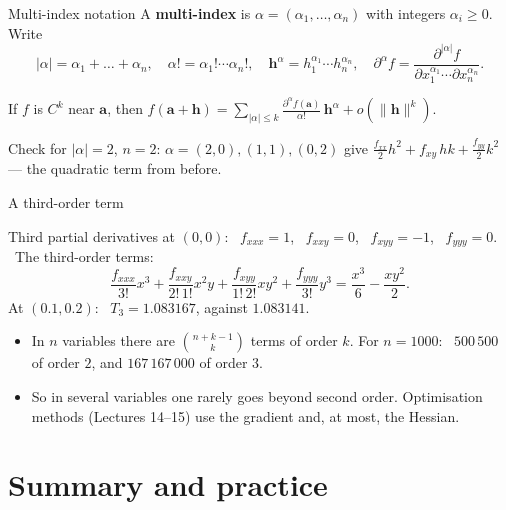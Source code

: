 \documentclass[10pt]{wosm-slides}
\newcommand{\norm}[1]{\lVert #1 \rVert}
\newcommand{\va}{\mathbf{a}}
\newcommand{\vh}{\mathbf{h}}
\begin{document}
\begin{frame}{Multi-index notation}
  A \textbf{multi-index} is $\alpha = (\alpha_1, \dots, \alpha_n)$ with integers $\alpha_i \ge 0$. Write
  \[ |\alpha| = \alpha_1 + \dots + \alpha_n, \quad \alpha! = \alpha_1! \cdots \alpha_n!, \quad
     \vh^\alpha = h_1^{\alpha_1} \cdots h_n^{\alpha_n}, \quad
     \partial^\alpha f = \frac{\partial^{|\alpha|} f}{\partial x_1^{\alpha_1} \cdots \partial x_n^{\alpha_n}} . \]
  \pause
  \begin{theorem}
    If $f$ is $C^k$ near $\va$, then
    $\displaystyle f(\va + \vh) = \sum_{|\alpha| \le k} \frac{\partial^\alpha f(\va)}{\alpha!}\, \vh^\alpha + o(\norm{\vh}^k)$.
  \end{theorem}
  {\small Check for $|\alpha| = 2$, $n = 2$: $\alpha = (2, 0), (1, 1), (0, 2)$ give
  $\frac{f_{xx}}{2} h^2 + f_{xy}\, hk + \frac{f_{yy}}{2} k^2$ --- the quadratic term from before.\par}
\end{frame}

\begin{frame}{A third-order term}
  \begin{example}
    Third partial derivatives at $(0, 0)$: \
    $f_{xxx} = 1$, \ $f_{xxy} = 0$, \ $f_{xyy} = -1$, \ $f_{yyy} = 0$. \ The third-order terms:
    \[ \frac{f_{xxx}}{3!} x^3 + \frac{f_{xxy}}{2!\,1!} x^2 y + \frac{f_{xyy}}{1!\,2!} x y^2 + \frac{f_{yyy}}{3!} y^3
       = \frac{x^3}{6} - \frac{x y^2}{2} . \]
    At $(0.1, 0.2)$: \ $T_3 = 1.083167$, against $1.083141$.
  \end{example}
  \pause
  \begin{itemize}
    \item In $n$ variables there are $\binom{n + k - 1}{k}$ terms of order $k$. For $n = 1000$: \
      $500\,500$ of order $2$, and $167\,167\,000$ of order $3$.
    \item So in several variables one rarely goes beyond second order. Optimisation methods
      (Lectures 14--15) use the gradient and, at most, the Hessian.
  \end{itemize}
\end{frame}

\section{Summary and practice}
\end{document}
